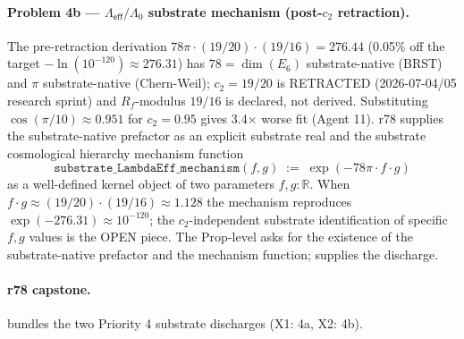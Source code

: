 \documentclass[11pt,a4paper]{amsart}
\theoremstyle{plain}
\theoremstyle{definition}
\begin{document}
\paragraph{Problem 4b --- $\Lambda_{\textsf{eff}}/\Lambda_0$ substrate mechanism (post-$c_2$ retraction).} The pre-retraction derivation $78\pi \cdot (19/20) \cdot (19/16) = 276.44$ (0.05\% off the target $-\ln(10^{-120}) \approx 276.31$) has $78 = \dim(E_6)$ substrate-native (BRST) and $\pi$ substrate-native (Chern-Weil); $c_2 = 19/20$ is RETRACTED (2026-07-04/05 research sprint) and $R_f$-modulus $19/16$ is declared, not derived. Substituting $\cos(\pi/10) \approx 0.951$ for $c_2 = 0.95$ gives 3.4$\times$ worse fit (Agent 11). r78 supplies the substrate-native prefactor as an explicit substrate real  and the substrate cosmological hierarchy mechanism function
\[
\texttt{substrate\_LambdaEff\_mechanism}(f, g) \;:=\; \exp(-78\pi \cdot f \cdot g)
\]
as a well-defined kernel object of two parameters $f, g : \mathbb{R}$. When $f \cdot g \approx (19/20) \cdot (19/16) \approx 1.128$ the mechanism reproduces $\exp(-276.31) \approx 10^{-120}$; the $c_2$-independent substrate identification of specific $f, g$ values is the OPEN piece. The Prop-level  asks for the existence of the substrate-native prefactor and the mechanism function;  supplies the discharge.

\paragraph{r78 capstone.}  bundles the two Priority 4 substrate discharges (X1: 4a, X2: 4b).
\end{document}
